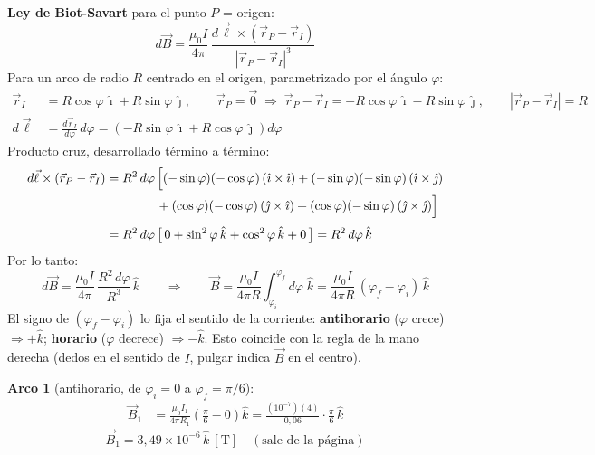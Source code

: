 \documentclass[12pt,letterpaper]{article}
\begin{document}
\noindent\textbf{Ley de Biot-Savart} para el punto $P$ = origen:
\[
    d\vec{B} = \frac{\mu_0 I}{4\pi}\,\frac{d\vec{\ell}\times(\vec{r}_P - \vec{r}_I)}{|\vec{r}_P - \vec{r}_I|^3}
\]
Para un arco de radio $R$ centrado en el origen, parametrizado por el \'angulo $\varphi$:
\begin{align*}
    \vec{r}_I &= R\cos\varphi\,\hat{\imath} + R\sin\varphi\,\hat{\jmath},\qquad
    \vec{r}_P = \vec{0}\;\Rightarrow\;
    \vec{r}_P - \vec{r}_I = -R\cos\varphi\,\hat{\imath} - R\sin\varphi\,\hat{\jmath},\qquad
    |\vec{r}_P - \vec{r}_I| = R\\[3pt]
    d\vec{\ell} &= \frac{d\vec{r}_I}{d\varphi}\,d\varphi
                 = \left(-R\sin\varphi\,\hat{\imath} + R\cos\varphi\,\hat{\jmath}\right)d\varphi
\end{align*}
Producto cruz, desarrollado t\'ermino a t\'ermino:
\begin{align*}
    d\vec{\ell}\times(\vec{r}_P-\vec{r}_I)
    &= R^2\,d\varphi\,\Bigl[(-\sin\varphi)(-\cos\varphi)\,(\hat{\imath}\times\hat{\imath})
       + (-\sin\varphi)(-\sin\varphi)\,(\hat{\imath}\times\hat{\jmath})\\
    &\qquad\qquad + (\cos\varphi)(-\cos\varphi)\,(\hat{\jmath}\times\hat{\imath})
       + (\cos\varphi)(-\sin\varphi)\,(\hat{\jmath}\times\hat{\jmath})\Bigr]\\[3pt]
    &= R^2\,d\varphi\,\bigl[\,0 + \sin^2\varphi\,\hat{k} + \cos^2\varphi\,\hat{k} + 0\,\bigr]
     = R^2\,d\varphi\,\hat{k}
\end{align*}
Por lo tanto:
\[
    d\vec{B} = \frac{\mu_0 I}{4\pi}\,\frac{R^2\,d\varphi}{R^3}\,\hat{k}
    \qquad\Longrightarrow\qquad
    \vec{B} = \frac{\mu_0 I}{4\pi R}\int_{\varphi_i}^{\varphi_f} d\varphi\;\hat{k}
    = \frac{\mu_0 I}{4\pi R}\,(\varphi_f - \varphi_i)\,\hat{k}
\]
El signo de $(\varphi_f - \varphi_i)$ lo fija el sentido de la corriente: \textbf{antihorario}
($\varphi$ crece) $\Rightarrow +\hat{k}$; \textbf{horario} ($\varphi$ decrece) $\Rightarrow -\hat{k}$.
Esto coincide con la regla de la mano derecha (dedos en el sentido de $I$, pulgar indica $\vec{B}$ en
el centro).

\medskip
\noindent\textbf{Arco 1} (antihorario, de $\varphi_i = 0$ a $\varphi_f = \pi/6$):
\begin{align*}
    \vec{B}_1 &= \frac{\mu_0 I_1}{4\pi R_1}\left(\frac{\pi}{6} - 0\right)\hat{k}
    = \frac{(10^{-7})(4)}{0{,}06}\cdot\frac{\pi}{6}\,\hat{k}
\end{align*}
\[
    \boxed{\vec{B}_1 = 3{,}49\times10^{-6}\,\hat{k}\ [\text{T}]\quad(\text{sale de la p\'agina})}
\]
\end{document}
